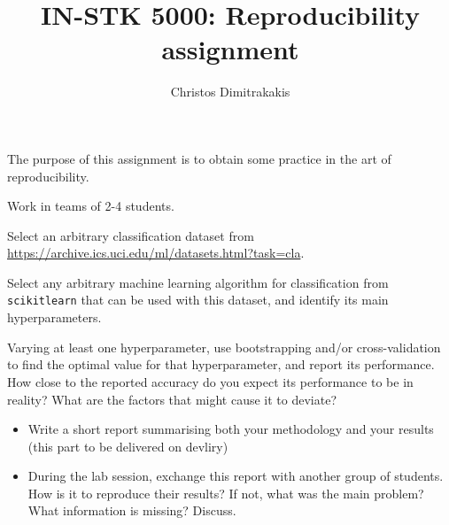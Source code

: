 \documentclass[a4paper]{article}
\title{IN-STK 5000: Reproducibility assignment}
\author{Christos Dimitrakakis}
\begin{document}
\maketitle
The purpose of this assignment is to obtain some practice in the art of reproducibility.

\begin{exercise}
  Work in teams of 2-4 students.

  Select an arbitrary classification dataset from \url{https://archive.ics.uci.edu/ml/datasets.html?task=cla}. 

  Select any arbitrary machine learning algorithm for classification
  from \texttt{scikitlearn} that can be used with this dataset, and identify its main hyperparameters.
    
  Varying at least one hyperparameter, use bootstrapping and/or
  cross-validation to find the optimal value for that hyperparameter,
  and report its performance. How close to the reported accuracy do
  you expect its performance to be in reality?  What are the factors
  that might cause it to deviate?
  
  \begin{itemize}
  \item Write a short report summarising both your methodology and
    your results (this part to be delivered on devliry)

  \item During the lab session, exchange this report with another
    group of students.  How is it to reproduce their results? If not,
    what was the main problem? What information is missing? Discuss.
  \end{itemize}


\end{exercise}
\end{document}
